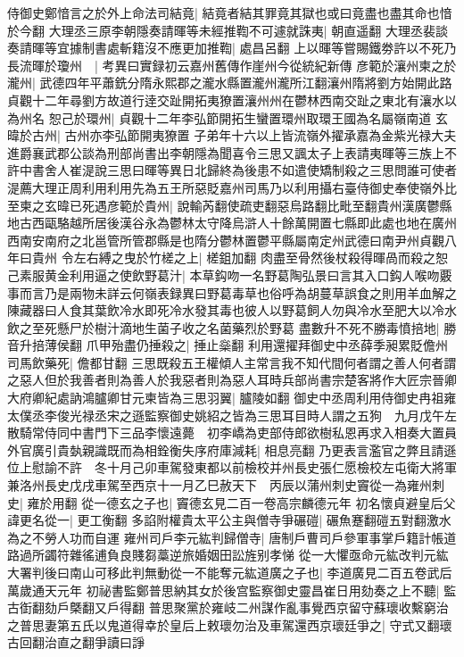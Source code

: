 侍御史鄭愔言之於外上命法司結竟|{
	結竟者結其罪竟其獄也或曰竟盡也盡其命也愔於今翻}
大理丞三原李朝隱奏請暉等未經推鞫不可遽就誅夷|{
	朝直遥翻}
大理丞裴談奏請暉等宜據制書處斬籍沒不應更加推鞫|{
	處昌呂翻}
上以暉等嘗賜鐵劵許以不死乃長流暉於瓊州　|{
	考異曰實録初云嘉州舊傳作崖州今從統紀新傳}
彦範於瀼州柬之於瀧州|{
	武德四年平蕭銑分隋永熙郡之瀧水縣置瀧州瀧所江翻瀼州隋將劉方始開此路貞觀十二年尋劉方故道行逹交趾開拓夷獠置瀼州州在鬱林西南交趾之東北有瀼水以為州名}
恕己於環州|{
	貞觀十二年李弘節開拓生蠻置環州取環王國為名屬嶺南道}
玄暐於古州|{
	古州亦李弘節開夷獠置}
子弟年十六以上皆流嶺外擢承嘉為金紫光禄大夫進爵襄武郡公談為刑部尚書出李朝隱為聞喜令三思又諷太子上表請夷暉等三族上不許中書舍人崔湜說三思曰暉等異日北歸終為後患不如遣使矯制殺之三思問誰可使者湜薦大理正周利用利用先為五王所惡貶嘉州司馬乃以利用攝右臺侍御史奉使嶺外比至柬之玄暐已死遇彦範於貴州|{
	說輸芮翻使疏吏翻惡烏路翻比毗至翻貴州漢廣鬱縣地古西甌駱越所居後漢谷永為鬱林太守降烏滸人十餘萬開置七縣即此處也地在廣州西南安南府之北邕管所管郡縣是也隋分鬱林置鬱平縣屬南定州武德曰南尹州貞觀八年曰貴州}
令左右縛之曳於竹槎之上|{
	槎鉏加翻}
肉盡至骨然後杖殺得暉咼而殺之恕己素服黄金利用逼之使飲野葛汁|{
	本草鈎吻一名野葛陶弘景曰言其入口鈎人喉吻覈事而言乃是兩物未詳云何嶺表録異曰野葛毒草也俗呼為胡蔓草誤食之則用羊血解之陳藏器曰人食其葉飲冷水即死冷水發其毒也彼人以野葛飼人勿與冷水至肥大以冷水飲之至死懸尸於樹汁滴地生菌子收之名菌藥烈於野葛}
盡數升不死不勝毒憤掊地|{
	勝音升掊薄侯翻}
爪甲殆盡仍捶殺之|{
	捶止橤翻}
利用還擢拜御史中丞薛季昶累貶儋州司馬飲藥死|{
	儋都甘翻}
三思既殺五王權傾人主常言我不知代間何者謂之善人何者謂之惡人但於我善者則為善人於我惡者則為惡人耳時兵部尚書宗楚客將作大匠宗晉卿大府卿紀處訥鴻臚卿甘元柬皆為三思羽翼|{
	臚陵如翻}
御史中丞周利用侍御史冉祖雍太僕丞李俊光禄丞宋之遜監察御史姚紹之皆為三思耳目時人謂之五狗　九月戊午左散騎常侍同中書門下三品李懷遠薨　初李嶠為吏部侍郎欲樹私恩再求入相奏大置員外官廣引貴埶親識既而為相銓衡失序府庫減耗|{
	相息亮翻}
乃更表言濫官之弊且請遜位上慰諭不許　冬十月己卯車駕發東都以前檢校并州長史張仁愿檢校左屯衛大將軍兼洛州長史戊戌車駕至西京十一月乙巳赦天下　丙辰以蒲州刺史竇從一為雍州刺史|{
	雍於用翻}
從一德玄之子也|{
	竇德玄見二百一卷高宗麟德元年}
初名懷貞避皇后父諱更名從一|{
	更工衡翻}
多諂附權貴太平公主與僧寺爭碾磑|{
	碾魚蹇翻磑五對翻激水為之不勞人功而自運}
雍州司戶李元紘判歸僧寺|{
	唐制戶曹司戶參軍事掌戶籍計帳道路過所蠲符雜徭逋負良賤芻藁逆旅婚姻田訟旌别孝悌}
從一大懼亟命元紘改判元紘大署判後曰南山可移此判無動從一不能奪元紘道廣之子也|{
	李道廣見二百五卷武后萬歲通天元年}
初祕書監鄭普思納其女於後宫監察御史靈昌崔日用劾奏之上不聽|{
	監古衘翻劾戶槩翻又戶得翻}
普思聚黨於雍岐二州謀作亂事覺西京留守蘇瓌收繫窮治之普思妻第五氏以鬼道得幸於皇后上敕瓌勿治及車駕還西京瓌廷爭之|{
	守式又翻瓌古回翻治直之翻爭讀曰諍}
